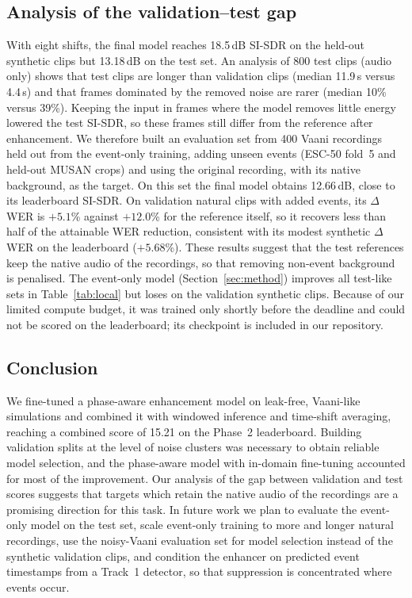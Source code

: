 \documentclass[conference]{IEEEtran}
\begin{document}
\subsection{Analysis of the validation--test gap}
With eight shifts, the final model reaches 18.5\,dB SI-SDR on the held-out synthetic clips but 13.18\,dB on the test set. An analysis of 800 test clips (audio only) shows that test clips are longer than validation clips (median 11.9\,s versus 4.4\,s) and that frames dominated by the removed noise are rarer (median 10\% versus 39\%). Keeping the input in frames where the model removes little energy lowered the test SI-SDR, so these frames still differ from the reference after enhancement. We therefore built an evaluation set from 400 Vaani recordings held out from the event-only training, adding unseen events (ESC-50 fold~5 and held-out MUSAN crops) and using the original recording, with its native background, as the target. On this set the final model obtains 12.66\,dB, close to its leaderboard SI-SDR. On validation natural clips with added events, its $\Delta$WER is $+5.1$\% against $+12.0$\% for the reference itself, so it recovers less than half of the attainable WER reduction, consistent with its modest synthetic $\Delta$WER on the leaderboard ($+5.68$\%). These results suggest that the test references keep the native audio of the recordings, so that removing non-event background is penalised. The event-only model (Section~\ref{sec:method}) improves all test-like sets in Table~\ref{tab:local} but loses on the validation synthetic clips. Because of our limited compute budget, it was trained only shortly before the deadline and could not be scored on the leaderboard; its checkpoint is included in our repository.

\subsection{Conclusion}
We fine-tuned a phase-aware enhancement model on leak-free, Vaani-like simulations and combined it with windowed inference and time-shift averaging, reaching a combined score of 15.21 on the Phase~2 leaderboard. Building validation splits at the level of noise clusters was necessary to obtain reliable model selection, and the phase-aware model with in-domain fine-tuning accounted for most of the improvement. Our analysis of the gap between validation and test scores suggests that targets which retain the native audio of the recordings are a promising direction for this task. In future work we plan to evaluate the event-only model on the test set, scale event-only training to more and longer natural recordings, use the noisy-Vaani evaluation set for model selection instead of the synthetic validation clips, and condition the enhancer on predicted event timestamps from a Track~1 detector, so that suppression is concentrated where events occur.



\end{document}
